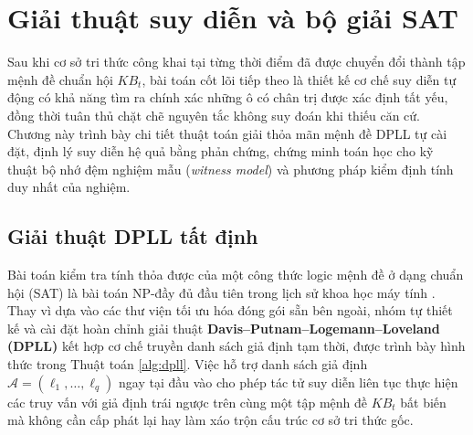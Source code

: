 \section{Giải thuật suy diễn và bộ giải SAT}
\label{sec:algorithms}

Sau khi cơ sở tri thức công khai tại từng thời điểm đã được chuyển đổi thành tập
mệnh đề chuẩn hội $KB_t$, bài toán cốt lõi tiếp theo là thiết kế cơ chế suy diễn
tự động có khả năng tìm ra chính xác những ô có chân trị được xác định tất yếu,
đồng thời tuân thủ chặt chẽ nguyên tắc không suy đoán khi thiếu căn cứ. Chương này
trình bày chi tiết thuật toán giải thỏa mãn mệnh đề DPLL tự cài đặt, định lý suy
diễn hệ quả bằng phản chứng, chứng minh toán học cho kỹ thuật bộ nhớ đệm nghiệm
mẫu (\textit{witness model}) và phương pháp kiểm định tính duy nhất của nghiệm.

\subsection{Giải thuật DPLL tất định}
\label{subsec:dpll_solver}
Bài toán kiểm tra tính thỏa được của một công thức logic mệnh đề ở dạng chuẩn hội
(SAT) là bài toán $\text{NP}$-đầy đủ đầu tiên trong lịch sử khoa học máy tính
\cite{cook1971complexity}. Thay vì dựa vào các thư viện tối ưu hóa đóng gói sẵn
bên ngoài, nhóm tự thiết kế và cài đặt hoàn chỉnh giải thuật
\textbf{Davis--Putnam--Logemann--Loveland (DPLL)}
\cite{davis1960computing,davis1962machine} kết hợp cơ chế truyền danh sách giả
định tạm thời, được trình bày hình thức trong Thuật toán \ref{alg:dpll}. Việc hỗ
trợ danh sách giả định $\mathcal{A} = (\ell_1, \dots, \ell_q)$ ngay tại đầu vào
cho phép tác tử suy diễn liên tục thực hiện các truy vấn với giả định trái ngược
trên cùng một tập mệnh đề $KB_t$ bất biến mà không cần cấp phát lại hay làm xáo
trộn cấu trúc cơ sở tri thức gốc.

